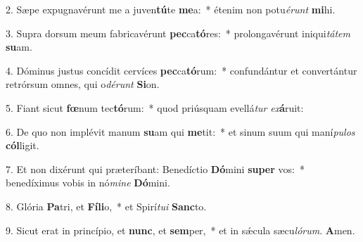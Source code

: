 2. Sæpe expugnavérunt me a juven\textbf{tú}te \textbf{me}a:~*  étenim non potu\textit{é}\textit{runt} \textbf{mi}hi.\

3. Supra dorsum meum fabricavérunt \textbf{pec}ca\textbf{tó}res:~*  prolongavérunt iniqui\textit{tá}\textit{tem} \textbf{su}am.\

4. Dóminus justus concídit cervíces \textbf{pec}ca\textbf{tó}rum:~*  confundántur et convertántur retrórsum omnes, qui o\textit{dé}\textit{runt} \textbf{Si}on.\

5. Fiant sicut \textbf{fœ}num tec\textbf{tó}rum:~*  quod priúsquam evellá\textit{tur} \textit{ex}\textbf{á}ruit:\

6. De quo non implévit manum \textbf{su}am qui \textbf{me}tit:~*  et sinum suum qui maní\textit{pu}\textit{los} \textbf{cól}ligit.\

7. Et non dixérunt qui præteríbant: Benedíctio \textbf{Dó}mini \textbf{su}\textbf{per} vos:~*  benedíximus vobis in nó\textit{mi}\textit{ne} \textbf{Dó}mini.\

8. Glória \textbf{Pa}tri, et \textbf{Fí}\textbf{li}o,~*  et Spirí\textit{tu}\textit{i} \textbf{Sanc}to.\

9. Sicut erat in princípio, et \textbf{nunc}, et \textbf{sem}per,~*  et in sǽcula sæcu\textit{ló}\textit{rum}. \textbf{A}men.\

